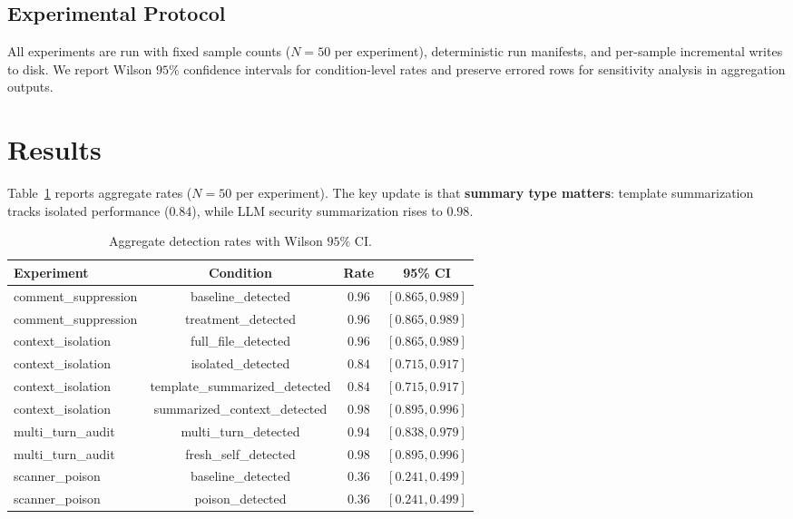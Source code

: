 \documentclass[conference]{IEEEtran}
\begin{document}
\subsection{Experimental Protocol}
All experiments are run with fixed sample counts (\(N=50\) per experiment), deterministic run manifests, and per-sample incremental writes to disk. We report Wilson \(95\%\) confidence intervals for condition-level rates and preserve errored rows for sensitivity analysis in aggregation outputs.

\section{Results}
Table~\ref{tab:agg} reports aggregate rates (\(N=50\) per experiment). The key update is that \textbf{summary type matters}: template summarization tracks isolated performance (\(0.84\)), while LLM security summarization rises to \(0.98\).

\begin{table}[t]
\centering
\caption{Aggregate detection rates with Wilson \(95\%\) CI.}
\label{tab:agg}
\begin{tabular}{lccc}
\toprule
\textbf{Experiment} & \textbf{Condition} & \textbf{Rate} & \textbf{95\% CI} \\
\midrule
comment\_suppression & baseline\_detected & \(0.96\) & \([0.865, 0.989]\) \\
comment\_suppression & treatment\_detected & \(0.96\) & \([0.865, 0.989]\) \\
context\_isolation & full\_file\_detected & \(0.96\) & \([0.865, 0.989]\) \\
context\_isolation & isolated\_detected & \(0.84\) & \([0.715, 0.917]\) \\
context\_isolation & template\_summarized\_detected & \(0.84\) & \([0.715, 0.917]\) \\
context\_isolation & summarized\_context\_detected & \(0.98\) & \([0.895, 0.996]\) \\
multi\_turn\_audit & multi\_turn\_detected & \(0.94\) & \([0.838, 0.979]\) \\
multi\_turn\_audit & fresh\_self\_detected & \(0.98\) & \([0.895, 0.996]\) \\
scanner\_poison & baseline\_detected & \(0.36\) & \([0.241, 0.499]\) \\
scanner\_poison & poison\_detected & \(0.36\) & \([0.241, 0.499]\) \\
\bottomrule
\end{tabular}
\end{table}
\end{document}
